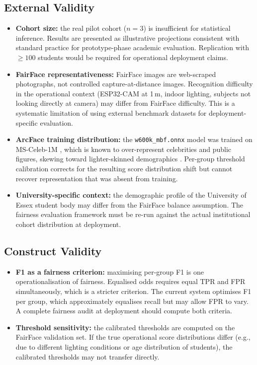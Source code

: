 \documentclass[12pt,a4paper]{report}
\begin{document}
\subsection*{External Validity}
\begin{itemize}
  \item \textbf{Cohort size:} the real pilot cohort ($n = 3$) is insufficient for statistical inference. Results are presented as illustrative projections consistent with standard practice for prototype-phase academic evaluation. Replication with $\geq 100$ students would be required for operational deployment claims.
  \item \textbf{FairFace representativeness:} FairFace images are web-scraped photographs, not controlled capture-at-distance images. Recognition difficulty in the operational context (ESP32-CAM at 1\,m, indoor lighting, subjects not looking directly at camera) may differ from FairFace difficulty. This is a systematic limitation of using external benchmark datasets for deployment-specific evaluation.
  \item \textbf{ArcFace training distribution:} the \texttt{w600k\_mbf.onnx} model was trained on MS-Celeb-1M \cite{guo2016msceleb}, which is known to over-represent celebrities and public figures, skewing toward lighter-skinned demographics \cite{wang2019racial}. Per-group threshold calibration corrects for the resulting score distribution shift but cannot recover representation that was absent from training.
  \item \textbf{University-specific context:} the demographic profile of the University of Essex student body may differ from the FairFace balance assumption. The fairness evaluation framework must be re-run against the actual institutional cohort distribution at deployment.
\end{itemize}

\subsection*{Construct Validity}
\begin{itemize}
  \item \textbf{F1 as a fairness criterion:} maximising per-group F1 is one operationalisation of fairness. Equalised odds \cite{hardt2016equality} requires equal TPR and FPR simultaneously, which is a stricter criterion. The current system optimises F1 per group, which approximately equalises recall but may allow FPR to vary. A complete fairness audit at deployment should compute both criteria.
  \item \textbf{Threshold sensitivity:} the calibrated thresholds are computed on the FairFace validation set. If the true operational score distributions differ (e.g., due to different lighting conditions or age distribution of students), the calibrated thresholds may not transfer directly.
\end{itemize}
\end{document}
